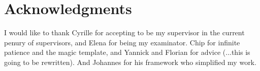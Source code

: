 \documentclass[nomenclature, english, bibtex]{kththesis}
\begin{document}

\section*{Acknowledgments}

I would like to thank Cyrille for accepting to be my supervisor in the current penury of supervisors, and Elena for being my examinator. Chip for infinite patience and the magic template, and Yannick and Florian for advice (...this is going to be rewritten). And Johannes for his framework who simplified my work.
\end{document}
